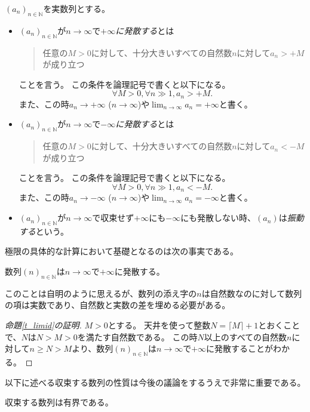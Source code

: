 \begin{definition}[数列の発散]
$(a_n)_{n \in \mathbb{N}}$を実数列とする。
\begin{itemize}
\item
$(a_n)_{n \in \mathbb{N}}$が$n \to \infty$で\emph{$+\infty$に発散する}とは
\begin{quote}
任意の$M > 0$に対して、十分大きいすべての自然数$n$に対して$a_n > +M$が成り立つ
\end{quote}
ことを言う。
この条件を論理記号で書くと以下になる。
$$
\forall M > 0, \forall n \gg 1, a_n > +M.
$$
また、この時$a_n \to +\infty$ ($n \to \infty$)や$\lim_{n \to \infty}a_n = +\infty$と書く。
\item
$(a_n)_{n \in \mathbb{N}}$が$n \to \infty$で\emph{$-\infty$に発散する}とは
\begin{quote}
任意の$M > 0$に対して、十分大きいすべての自然数$n$に対して$a_n < -M$が成り立つ
\end{quote}
ことを言う。
この条件を論理記号で書くと以下になる。
$$
\forall M > 0, \forall n \gg 1, a_n < -M.
$$
また、この時$a_n \to -\infty$ ($n \to \infty$)や$\lim_{n \to \infty}a_n = -\infty$と書く。
\item
$(a_n)_{n \in \mathbb{N}}$が$n \to \infty$で収束せず$+\infty$にも$-\infty$にも発散しない時、$(a_n)$は\emph{振動する}という。

\end{itemize}
\end{definition}

極限の具体的な計算において基礎となるのは次の事実である。

\begin{proposition}
\label{t_limid}
数列$(n)_{n \in \mathbb{N}}$は$n \to \infty$で$+\infty$に発散する。
\end{proposition}

このことは自明のように思えるが、数列の添え字の$n$は自然数なのに対して数列の項は実数であり、自然数と実数の差を埋める必要がある。

\begin{proof}[命題\ref{t_limid}の証明]
$M > 0$とする。
天井を使って整数$N = \lceil M \rceil+1$とおくことで、$N$は$N > M > 0$を満たす自然数である。
この時$N$以上のすべての自然数$n$に対して$n \ge N > M$より、数列$(n)_{n \in \mathbb{N}}$は$n \to \infty$で$+\infty$に発散することがわかる。
\end{proof}

以下に述べる収束する数列の性質は今後の議論をするうえで非常に重要である。

\begin{proposition}
\label{t_conv_bdd}
収束する数列は有界である。
\end{proposition}


